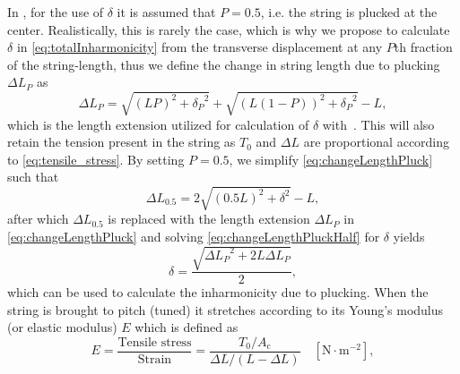\documentclass{article}
\begin{document}
\begin{sloppy}
%
In \cite{rossing:science_of_string_instruments}, for the use of $\delta$ it is assumed that $P=0.5$, i.e. the string is plucked at the center. Realistically, this is rarely the case, which is why we propose to calculate $\delta$ in \eqref{eq:totalInharmonicity} from the transverse displacement at any $P$th fraction of the string-length, thus we define the change in string length due to plucking $\Delta L_P $ as
\begin{equation}\label{eq:changeLengthPluck}
    \Delta L_P = \sqrt{(LP)^2+{\delta_P}^2}+\sqrt{(L(1-P))^2+{\delta_P}^2} - L,
\end{equation}
which is the length extension utilized for calculation of $\delta$ with~\cite{rossing:science_of_string_instruments}. %
This will also retain the tension present in the string as $T_0$ and $\Delta L$ are proportional according to \eqref{eq:tensile_stress}. By setting $P = 0.5$, we simplify \eqref{eq:changeLengthPluck} such that
%
\begin{equation}\label{eq:changeLengthPluckHalf}
    \Delta L_{0.5} = 2\sqrt{(0.5L)^2 + \delta^2} - L,
\end{equation}
%
after which $\Delta L_{0.5}$ is replaced with the length extension $\Delta L_P$ in \eqref{eq:changeLengthPluck} and solving \eqref{eq:changeLengthPluckHalf} for $\delta$ yields
\begin{equation}
    \delta = \frac{\sqrt{{\Delta L_P}^2+2L\Delta L_P}}{2},
\end{equation}
which can be used to calculate the inharmonicity due to plucking.
%
When the string is brought to pitch (tuned) it stretches according to its Young's modulus (or elastic modulus) $E$ which is defined as
%
\begin{equation}\label{eq:tensile_stress}
    E = \frac{\text{Tensile stress}}{\text{Strain}}
    = \frac{T_0/A_\text{c}}{\Delta L/(L - \Delta L)} \quad [\text{N}\cdot\text{m}^{-2}], 

\end{equation}
\end{sloppy}
\end{document}
